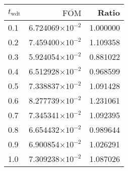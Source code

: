 \begin{tabular}{lrr}
\toprule
$t_{\mathrm{wdt}}$ & $\overline{\mathrm{FOM}}$ &    Ratio \\
\midrule
               0.1 &  6.724069$\times 10^{-2}$ & 1.000000 \\
               0.2 &  7.459400$\times 10^{-2}$ & 1.109358 \\
               0.3 &  5.924054$\times 10^{-2}$ & 0.881022 \\
               0.4 &  6.512928$\times 10^{-2}$ & 0.968599 \\
               0.5 &  7.338837$\times 10^{-2}$ & 1.091428 \\
               0.6 &  8.277739$\times 10^{-2}$ & 1.231061 \\
               0.7 &  7.345341$\times 10^{-2}$ & 1.092395 \\
               0.8 &  6.654432$\times 10^{-2}$ & 0.989644 \\
               0.9 &  6.900854$\times 10^{-2}$ & 1.026291 \\
               1.0 &  7.309238$\times 10^{-2}$ & 1.087026 \\
\bottomrule
\end{tabular}
